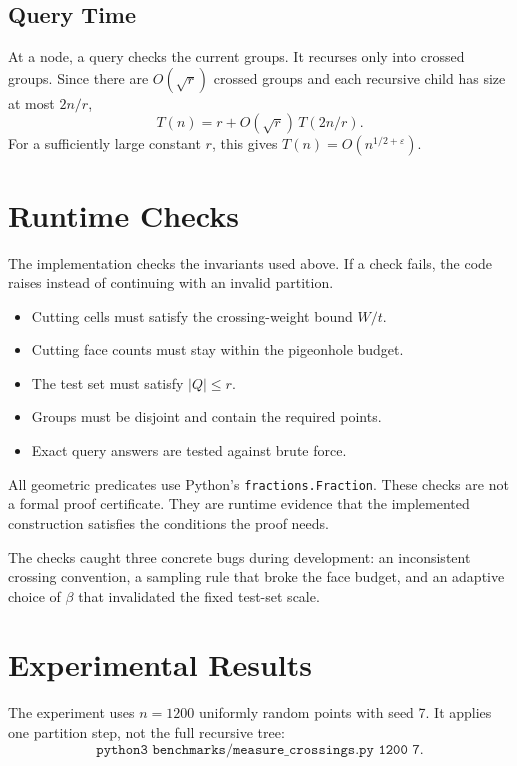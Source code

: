 \documentclass[11pt,a4paper]{article}
\begin{document}
\subsection{Query Time}

At a node, a query checks the current groups. It recurses only into
crossed groups. Since there are $O(\sqrt r)$ crossed groups and each
recursive child has size at most $2n/r$,
\[
  T(n)=r+O(\sqrt r)\,T(2n/r).
\]
For a sufficiently large constant $r$, this gives
$T(n)=O(n^{1/2+\varepsilon})$.


\section{Runtime Checks}
\label{sec:verification}

The implementation checks the invariants used above. If a check fails,
the code raises instead of continuing with an invalid partition.

\begin{itemize}[nosep,leftmargin=*]
  \item Cutting cells must satisfy the crossing-weight bound $W/t$.
  \item Cutting face counts must stay within the pigeonhole budget.
  \item The test set must satisfy $|Q|\le r$.
  \item Groups must be disjoint and contain the required points.
  \item Exact query answers are tested against brute force.
\end{itemize}

All geometric predicates use Python's \texttt{fractions.Fraction}.
These checks are not a formal proof certificate. They are runtime
evidence that the implemented construction satisfies the conditions
the proof needs.

The checks caught three concrete bugs during development: an
inconsistent crossing convention, a sampling rule that broke the face
budget, and an adaptive choice of $\beta$ that invalidated the fixed
test-set scale.


\section{Experimental Results}
\label{sec:experiments}

The experiment uses $n=1200$ uniformly random points with seed 7. It
applies one partition step, not the full recursive tree:
\[
  \texttt{python3 benchmarks/measure\_crossings.py 1200 7}.
\]
\end{document}
